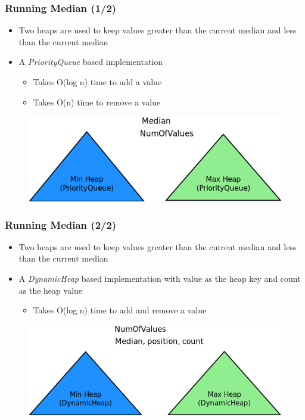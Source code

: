 \documentclass{beamer}
\begin{document}
\begin{frame}
\frametitle{Running Median (1/2)}

\begin{itemize}
        \item Two heaps are used to keep values greater than the current median and less than the current median
        \item A \textit{PriorityQueue} based implementation
		\begin{itemize}
        		\item Takes O(log n) time to add a value 
        		\item Takes O(n) time to remove a value
		\end{itemize}
\end{itemize}

\begin{figure}
        \includegraphics[width=0.6\linewidth]{runningmediang.png}
\end{figure}

\end{frame}


\begin{frame}
\frametitle{Running Median (2/2)}

\begin{itemize}
        \item Two heaps are used to keep values greater than the current median and less than the current median
        \item A \textit{DynamicHeap} based implementation with value as the heap key and count as the heap value 
                \begin{itemize}
                        \item Takes O(log n) time to add and remove a value
                \end{itemize}
\end{itemize}

\begin{figure}
        \includegraphics[width=0.6\linewidth]{runningmediand.png}
\end{figure}

\end{frame}
\end{document}
